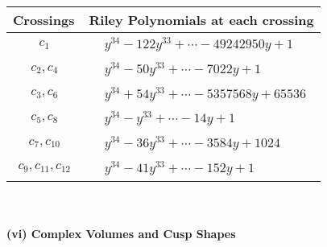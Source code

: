 \documentclass[1p]{elsarticle_modified}
\theoremstyle{definition}
\begin{document}
\begin{tabular}{m{50pt}|m{274pt}}
Crossings & \hspace{64pt}Riley Polynomials at each crossing \\
\hline $$\begin{aligned}c_{1}\end{aligned}$$&$\begin{aligned}
&y^{34}-122 y^{33}+\cdots-49242950 y+1
\end{aligned}$\\
\hline $$\begin{aligned}c_{2},c_{4}\end{aligned}$$&$\begin{aligned}
&y^{34}-50 y^{33}+\cdots-7022 y+1
\end{aligned}$\\
\hline $$\begin{aligned}c_{3},c_{6}\end{aligned}$$&$\begin{aligned}
&y^{34}+54 y^{33}+\cdots-5357568 y+65536
\end{aligned}$\\
\hline $$\begin{aligned}c_{5},c_{8}\end{aligned}$$&$\begin{aligned}
&y^{34}- y^{33}+\cdots-14 y+1
\end{aligned}$\\
\hline $$\begin{aligned}c_{7},c_{10}\end{aligned}$$&$\begin{aligned}
&y^{34}-36 y^{33}+\cdots-3584 y+1024
\end{aligned}$\\
\hline $$\begin{aligned}c_{9},c_{11},c_{12}\end{aligned}$$&$\begin{aligned}
&y^{34}-41 y^{33}+\cdots-152 y+1
\end{aligned}$\\
\hline
\end{tabular}\\~\\
\newpage\flushleft \textbf{(vi) Complex Volumes and Cusp Shapes}
\end{document}
